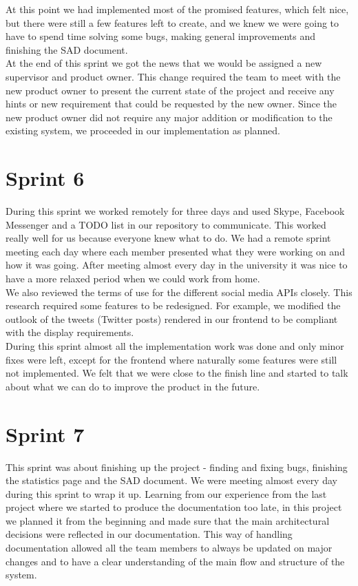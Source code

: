 At this point we had implemented most of the promised features, which felt nice,
but there were still a few features left to create, and we knew we were going to
have to spend time solving some bugs, making general improvements and finishing
the SAD document. \\

At the end of this sprint we got the news that we would be assigned a new
supervisor and product owner. This change required the team to meet with the new
product owner to present the current state of the project and receive any hints
or new requirement that could be requested by the new owner. Since the new
product owner did not require any major addition or modification to the existing
system, we proceeded in our implementation as planned.

\section{Sprint 6}
During this sprint we worked remotely for three days and used Skype, Facebook
Messenger and a TODO list in our repository to communicate. This worked really
well for us because everyone knew what to do. We had a remote sprint meeting
each day where each member presented what they were working on and how it was
going. After meeting almost every day in the university it was nice to have a
more relaxed period when we could work from home. \\

We also reviewed the terms of use for the different social media APIs closely.
This research required some features to be redesigned. For example, we modified
the outlook of the tweets (Twitter posts) rendered in our frontend to be
compliant with the display requirements. \\

During this sprint almost all the implementation work was done and only minor
fixes were left, except for the frontend where naturally some features were
still not implemented. We felt that we were close to the finish line and started
to talk about what we can do to improve the product in the future.

\section{Sprint 7}
This sprint was about finishing up the project - finding and fixing bugs,
finishing the statistics page and the SAD document. We were meeting almost every
day during this sprint to wrap it up. Learning from our experience from the last
project where we started to produce the documentation too late, in this project
we planned it from the beginning and made sure that the main architectural
decisions were reflected in our documentation. This way of handling
documentation allowed all the team members to always be updated on major changes
and to have a clear understanding of the main flow and structure of the
system. \\

